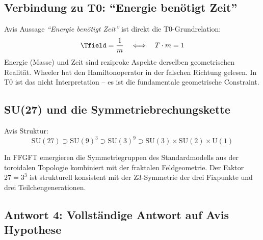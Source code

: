 \subsection{Verbindung zu T0: ``Energie benötigt Zeit''}

Avis Aussage \textit{``Energie benötigt Zeit''} ist direkt die T0-Grundrelation:
\begin{equation}
  \Tfield = \frac{1}{m} \quad \Longleftrightarrow \quad T \cdot m = 1
\end{equation}
Energie (Masse) und Zeit sind reziproke Aspekte derselben geometrischen Realität. Wheeler hat den Hamiltonoperator in der falschen Richtung gelesen. In T0 ist das nicht Interpretation -- es ist die fundamentale geometrische Constraint.

\subsection{SU(27) und die Symmetriebrechungskette}

Avis Struktur:
\begin{equation}
  \mathrm{SU}(27) \supset \mathrm{SU}(9)^3 \supset \mathrm{SU}(3)^9 \supset \mathrm{SU}(3) \times \mathrm{SU}(2) \times \mathrm{U}(1)
\end{equation}

In FFGFT emergieren die Symmetriegruppen des Standardmodells aus der toroidalen Topologie kombiniert mit der fraktalen Feldgeometrie. Der Faktor $27 = 3^3$ ist strukturell konsistent mit der Z3-Symmetrie der drei Fixpunkte und drei Teilchengenerationen.

\subsection{Antwort 4: Vollständige Antwort auf Avis Hypothese}

